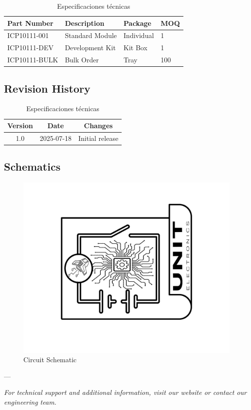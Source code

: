 \documentclass[11pt,a4paper]{article}
\begin{document}
\begin{table}[H]
\centering
\small
\begin{tabular}{|l|l|l|l|}
\hline
Part Number & Description & Package & MOQ \\
\hline
ICP10111-001 & Standard Module & Individual & 1 \\
ICP10111-DEV & Development Kit & Kit Box & 1 \\
ICP10111-BULK & Bulk Order & Tray & 100 \\
\hline
\end{tabular}
\caption{Especificaciones técnicas}
\end{table}


\subsection{Revision History}


\begin{table}[H]
\centering
\small
\begin{tabular}{|c|c|c|}
\hline
Version & Date & Changes \\
\hline
1.0 & 2025-07-18 & Initial release \\
\hline
\end{tabular}
\caption{Especificaciones técnicas}
\end{table}


\subsection{Schematics}


\begin{figure}[H]
\centering
\includegraphics[width=\textwidth]{en_Schematics_icon.jpg}
\caption{Circuit Schematic}
\label{fig:en-Schematics-icon-jpg}
\end{figure}



---

\textit{For technical support and additional information, visit our website or contact our engineering team.}
\end{document}
